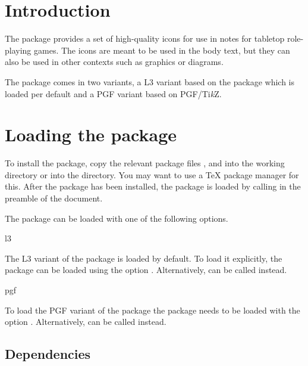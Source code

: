 \documentclass[a4paper]{article}
\begin{document}
\vspace*{-1cm}
\noindent\rpgiconslogo[4]

\bigskip

\printdoctitle

\bigskip

\section{Introduction}

The  package provides a set of high-quality icons for use in notes for tabletop role-playing games. The icons are meant to be used in the body text, but they can also be used in other contexts such as graphics or diagrams.

The package comes in two variants, a L3 variant based on the  package which is loaded per default and a PGF variant based on PGF/Ti\emph{k}Z.

\section{Loading the package}

To install the package, copy the relevant package files ,  and  into the working directory or into the  directory. You may want to use a TeX package manager for this. After the package has been installed, the  package is loaded by calling \macro{\usepackage{rpgicons}} in the preamble of the document.

The package can be loaded with one of the following options.

\begin{macrodef}l3\end{macrodef}
The L3 variant of the package is loaded by default. To load it explicitly, the package can be loaded using the option . Alternatively, \macro{\usepackage{rpgicons-l3}} can be called instead.

\begin{macrodef}pgf\end{macrodef}
To load the PGF variant of the package the package needs to be loaded with the option . Alternatively, \macro{\usepackage{rpgicons-pgf}} can be called instead.

\subsection{Dependencies}
\end{document}
